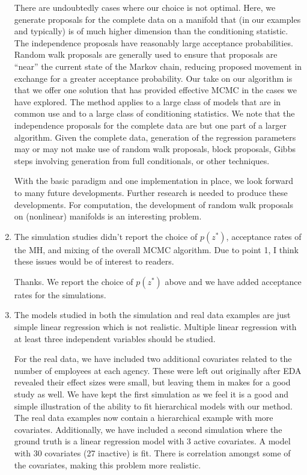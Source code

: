 \documentclass{article}
\newcommand{\response}[1]{{\color{blue}#1}}
\begin{document}
\begin{enumerate}
{There are undoubtedly cases where our choice is not optimal.  Here, we generate proposals for the complete data on a manifold that (in our examples and typically) is of much higher dimension than the conditioning statistic.  The independence proposals have reasonably large acceptance probabilities.  Random walk proposals are generally used to ensure that proposals are ``near'' the current state of the Markov chain, reducing proposed movement in exchange for a greater acceptance probability.  Our take on our algorithm is that we offer one solution that has provided effective MCMC in the cases we have explored.  The method applies to a large class of models that are in common use and to a large class of conditioning statistics.  We note that the independence proposals for the complete data are but one part of a larger algorithm.  Given the complete data, generation of the regression parameters may or may not make use of random walk proposals, block proposals, Gibbs steps involving generation from full conditionals, or other techniques.  

With the basic paradigm and one implementation in place, we look forward to many future developments.  Further research is needed to produce these developments.  For computation, the development of random walk proposals on (nonlinear) manifolds is an interesting problem.  
}






\item The simulation studies didn't report the choice of $p(z^{*})$, acceptance rates of the MH, and mixing of the overall MCMC algorithm. Due to point 1, I think these issues would be of interest to readers.

\response{Thanks. We report the choice of $p(z^{*})$ above and  we have added acceptance rates for the simulations.}


\item The models studied in both the simulation and real data examples are just simple linear regression which is not realistic. Multiple linear regression with at least three independent variables should be studied.

\response{For the real data, we have included two additional covariates related to the number of employees at each agency. These were left out originally after EDA revealed their effect sizes were small, but leaving them in makes for a good study as well. We have kept the first simulation as we feel it is a good and simple illustration of the ability to fit hierarchical models with our method. The real data examples now contain a hierarchical example with more covariates. Additionally, we have included a second simulation where the ground truth is a linear regression model with 3 active covariates.  A model with 30 covariates (27 inactive) is fit.  There is correlation amongst some of the covariates, making this problem more realistic.}


\end{enumerate}
\end{document}
